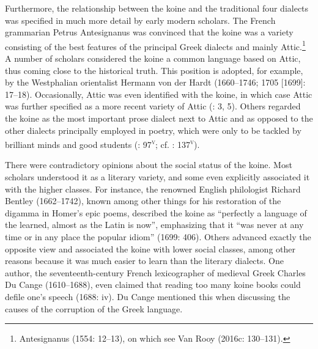 \documentclass[output=paper]{langsci/langscibook}
\begin{document}
Furthermore, the relationship between the koine and the traditional four dialects was specified in much more detail by early modern scholars. The French grammarian Petrus Antesignanus was convinced that the koine was a variety consisting of the best features of the principal Greek dialects and mainly Attic.\footnote{Antesignanus (1554: 12–13), on which see Van Rooy (2016c: 130–131).} A number of scholars considered the koine a common language based on Attic, thus coming close to the historical truth. This position is adopted, for example, by the Westphalian orientalist Hermann von der Hardt (1660–1746; 1705 [1699]: 17–18). Occasionally, Attic was even identified with the koine, in which case Attic was further specified as a more recent variety of Attic (\citealt{Georgi1733}: 3, 5). Others regarded the koine as the most important prose dialect next to Attic and as opposed to the other dialects principally employed in poetry, which were only to be tackled by brilliant minds and good students (\citealt{Vives1531}: 97\textsc{\textsuperscript{v}}; cf. \citealt{Vuidius1569}: 137\textsc{\textsuperscript{v}}).

There were contradictory opinions about the social status of the koine. Most scholars understood it as a literary variety, and some even explicitly associated it with the higher classes. For instance, the renowned English philologist Richard Bentley (1662–1742), known among other things for his restoration of the digamma in Homer’s epic poems, described the koine as “perfectly a language of the learned, almost as the Latin is now”, emphasizing that it “was never at any time or in any place the popular idiom” (1699: 406). Others advanced exactly the opposite view and associated the koine with lower social classes, among other reasons because it was much easier to learn than the literary dialects. One author, the seventeenth-century French lexicographer of medieval Greek Charles Du Cange (1610–1688), even claimed that reading too many koine books could defile one’s speech (1688: iv). Du Cange mentioned this when discussing the causes of the corruption of the Greek language.
\end{document}

